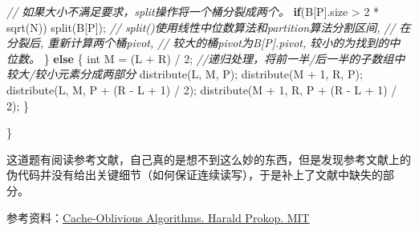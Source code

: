 \documentclass[]{article}
\newenvironment{Shaded}{}{}
\newcommand{\CommentTok}[1]{\textcolor[rgb]{0.38,0.63,0.69}{\textit{#1}}}
\newcommand{\ControlFlowTok}[1]{\textcolor[rgb]{0.00,0.44,0.13}{\textbf{#1}}}
\newcommand{\DataTypeTok}[1]{\textcolor[rgb]{0.56,0.13,0.00}{#1}}
\newcommand{\DecValTok}[1]{\textcolor[rgb]{0.25,0.63,0.44}{#1}}
\newcommand{\NormalTok}[1]{#1}
\begin{document}
\begin{itemize}
\begin{Shaded}
\begin{Highlighting}[]
		\CommentTok{// 如果大小不满足要求，split操作将一个桶分裂成两个。}
        \ControlFlowTok{if}\NormalTok{(B[P].size > }\DecValTok{2}\NormalTok{ * sqrt(N)) split(B[P]); }
        \CommentTok{// split()使用线性中位数算法和partition算法分割区间,}
        \CommentTok{// 在分裂后, 重新计算两个桶pivot,}
        \CommentTok{// 较大的桶pivot为B[P].pivot, 较小的为找到的中位数。}
\NormalTok{    \}}
    \ControlFlowTok{else}\NormalTok{ \{}
        \DataTypeTok{int}\NormalTok{ M = (L + R) / }\DecValTok{2}\NormalTok{; }
        \CommentTok{//递归处理，将前一半/后一半的子数组中较大/较小元素分成两部分}
\NormalTok{        distribute(L, M, P);}
\NormalTok{        distribute(M + }\DecValTok{1}\NormalTok{, R, P);}
\NormalTok{        distribute(L, M, P + (R - L + }\DecValTok{1}\NormalTok{) / }\DecValTok{2}\NormalTok{);}
\NormalTok{        distribute(M + }\DecValTok{1}\NormalTok{, R, P + (R - L + }\DecValTok{1}\NormalTok{) / }\DecValTok{2}\NormalTok{);}
\NormalTok{    \}}
    
\NormalTok{\}}
\end{Highlighting}
\end{Shaded}

  这道题有阅读参考文献，自己真的是想不到这么妙的东西，但是发现参考文献上的伪代码并没有给出关键细节（如何保证连续读写），于是补上了文献中缺失的部分。

  参考资料：\href{http://supertech.csail.mit.edu/papers/Prokop99.pdf}{Cache-Oblivious
  Algorithms. Harald Prokop. MIT}
\end{itemize}
\end{document}
